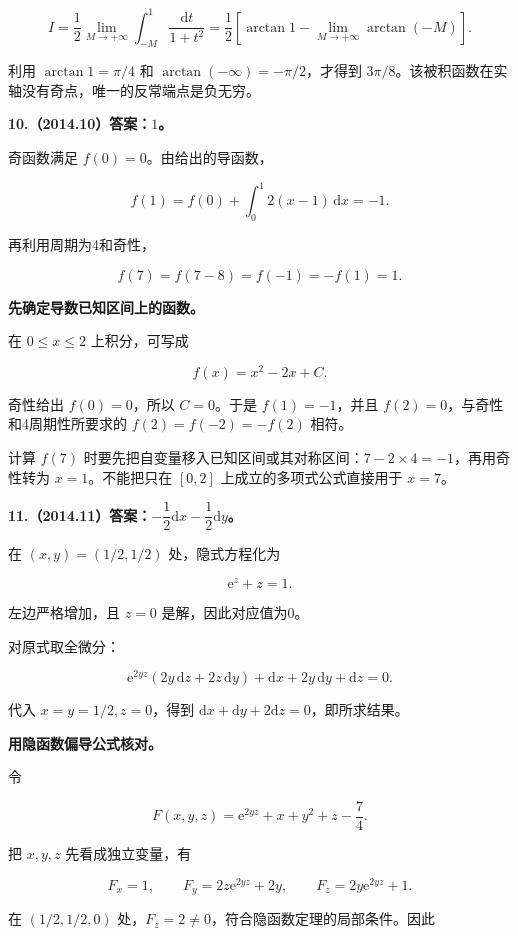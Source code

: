 \documentclass[UTF8,11pt,fontset=windows]{ctexart}
\begin{document}
$$
I=\frac12\lim_{M\to+\infty}\int_{-M}^{1}\frac{\mathrm dt}{1+t^2}
=\frac12\left[\arctan1-\lim_{M\to+\infty}\arctan(-M)\right].
$$

利用 $\arctan1=\pi/4$ 和 $\arctan(-\infty)=-\pi/2$，才得到 $3\pi/8$。该被积函数在实轴没有奇点，唯一的反常端点是负无穷。

\clearpage

\textbf{10.（2014.10）答案：$1$。}

奇函数满足 $f(0)=0$。由给出的导函数，

$$
f(1)=f(0)+\int_0^1 2(x-1)\,\mathrm dx=-1.
$$

再利用周期为4和奇性，

$$
f(7)=f(7-8)=f(-1)=-f(1)=1.
$$

\textbf{先确定导数已知区间上的函数。}

在 $0\le x\le2$ 上积分，可写成

$$
f(x)=x^2-2x+C.
$$

奇性给出 $f(0)=0$，所以 $C=0$。于是 $f(1)=-1$，并且 $f(2)=0$，与奇性和4周期性所要求的 $f(2)=f(-2)=-f(2)$ 相符。

计算 $f(7)$ 时要先把自变量移入已知区间或其对称区间：$7-2\times4=-1$，再用奇性转为 $x=1$。不能把只在 $[0,2]$ 上成立的多项式公式直接用于 $x=7$。

\clearpage

\textbf{11.（2014.11）答案：$-\dfrac12\mathrm dx-\dfrac12\mathrm dy$。}

在 $(x,y)=(1/2,1/2)$ 处，隐式方程化为

$$
\mathrm e^z+z=1.
$$

左边严格增加，且 $z=0$ 是解，因此对应值为0。

对原式取全微分：

$$
\mathrm e^{2yz}(2y\,\mathrm dz+2z\,\mathrm dy)
+\mathrm dx+2y\,\mathrm dy+\mathrm dz=0.
$$

代入 $x=y=1/2,z=0$，得到 $\mathrm dx+\mathrm dy+2\mathrm dz=0$，即所求结果。

\textbf{用隐函数偏导公式核对。}

令

$$
F(x,y,z)=\mathrm e^{2yz}+x+y^2+z-\frac74.
$$

把 $x,y,z$ 先看成独立变量，有

$$
F_x=1,\qquad F_y=2z\mathrm e^{2yz}+2y,
\qquad F_z=2y\mathrm e^{2yz}+1.
$$

在 $(1/2,1/2,0)$ 处，$F_z=2\ne0$，符合隐函数定理的局部条件。因此
\end{document}
